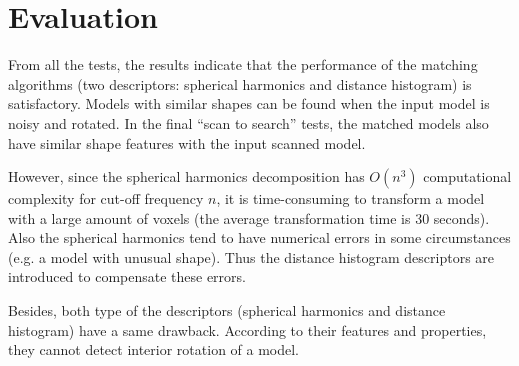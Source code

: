 \section{Evaluation}

From all the tests, the results indicate that the performance of the matching algorithms (two descriptors: spherical harmonics and distance histogram) is satisfactory. Models with similar shapes can be found when the input model is noisy and rotated. In the final ``scan to search'' tests, the matched models also have similar shape features with the input scanned model. 

However, since the spherical harmonics decomposition has $O(n^3)$ computational complexity for cut-off frequency $n$, it is time-consuming to transform a model with a large amount of voxels (the average transformation time is 30 seconds). Also the spherical harmonics tend to have numerical errors in some circumstances (e.g. a model with unusual shape). Thus the distance histogram descriptors are introduced to compensate these errors. 

Besides, both type of the descriptors (spherical harmonics and distance histogram) have a same drawback. According to their features and properties, they cannot detect interior rotation of a model. 

